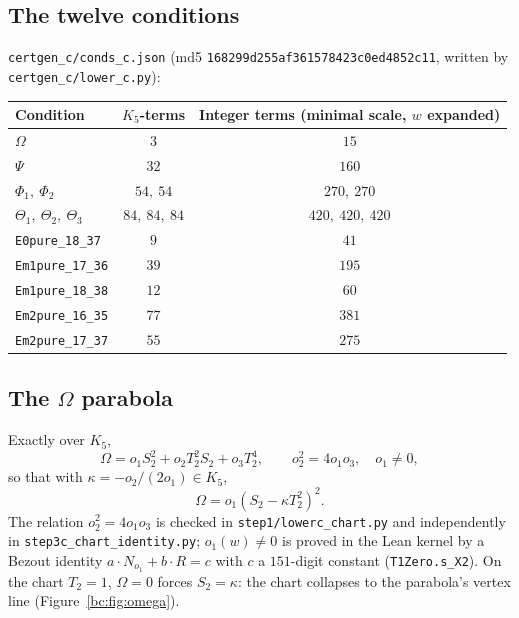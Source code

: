 \documentclass[a4paper,11pt]{article}
\theoremstyle{plain}
\theoremstyle{definition}
\theoremstyle{remark}
\begin{document}
\subsection{The twelve conditions}\label{bc:sec:twelve}

\texttt{certgen\_c/conds\_c.json} (md5 \texttt{168299d255af361578423c0ed4852c11}, written by \texttt{certgen\_c/lower\_c.py}):

\begin{center}
\begin{tabular}{lcc}
\toprule
Condition & $K_5$-terms & Integer terms (minimal scale, $w$ expanded) \\
\midrule
$\Omega$ & $3$ & $15$ \\
$\Psi$ & $32$ & $160$ \\
$\Phi_1,\ \Phi_2$ & $54,\ 54$ & $270,\ 270$ \\
$\Theta_1,\ \Theta_2,\ \Theta_3$ & $84,\ 84,\ 84$ & $420,\ 420,\ 420$ \\
\texttt{E0pure\_18\_37} & $9$ & $41$ \\
\texttt{Em1pure\_17\_36} & $39$ & $195$ \\
\texttt{Em1pure\_18\_38} & $12$ & $60$ \\
\texttt{Em2pure\_16\_35} & $77$ & $381$ \\
\texttt{Em2pure\_17\_37} & $55$ & $275$ \\
\bottomrule
\end{tabular}
\end{center}

\subsection{\texorpdfstring{The $\Omega$ parabola}{The Omega parabola}}\label{bc:sec:omega}

Exactly over $K_5$,
\begin{equation}\label{bc:eq:omega}
\Omega=o_1S_2^2+o_2T_2^2S_2+o_3T_2^4,\qquad o_2^2=4o_1o_3,\quad o_1\ne0,
\end{equation}
so that with $\kappa=-o_2/(2o_1)\in K_5$,
\begin{equation}\label{bc:eq:omegafactor}
\Omega=o_1(S_2-\kappa T_2^2)^2.
\end{equation}
The relation $o_2^2=4o_1o_3$ is checked in \texttt{step1/lowerc\_chart.py} and independently in \texttt{step3c\_chart\_identity.py}; $o_1(w)\ne0$ is proved in the Lean kernel by a Bezout identity $a\cdot N_{o_1}+b\cdot R=c$ with $c$ a $151$-digit constant (\texttt{T1Zero.s\_X2}). On the chart $T_2=1$, $\Omega=0$ forces $S_2=\kappa$: the chart collapses to the parabola's vertex line (Figure~\ref{bc:fig:omega}).
\end{document}
